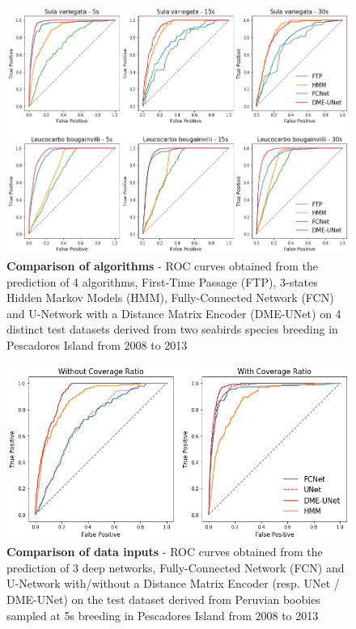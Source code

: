 \documentclass{article}
\begin{document}



\newpage

\begin{figure}[h]
  \centering
  \includegraphics[scale=0.5]{figure1.png}
  \caption{\textbf{Comparison of algorithms} - ROC curves obtained from the prediction of 4 algorithms, First-Time Passage (FTP), 3-states Hidden Markov Models (HMM), Fully-Connected Network (FCN) and U-Network with a Distance Matrix Encoder (DME-UNet) on 4 distinct test datasets derived from two seabirds species breeding in Pescadores Island from 2008 to 2013}
  \label{figure1}
\end{figure}

\begin{figure}[h]
  \centering
  \includegraphics[scale=0.5]{figure2.png}
  \caption{\textbf{Comparison of data inputs} - ROC curves obtained from the prediction of 3 deep networks, Fully-Connected Network (FCN) and U-Network with/without a Distance Matrix Encoder (resp. UNet / DME-UNet) on the test dataset derived from Peruvian boobies sampled at 5s breeding in Pescadores Island from 2008 to 2013}
  \label{figure2}
\end{figure}
\end{document}

